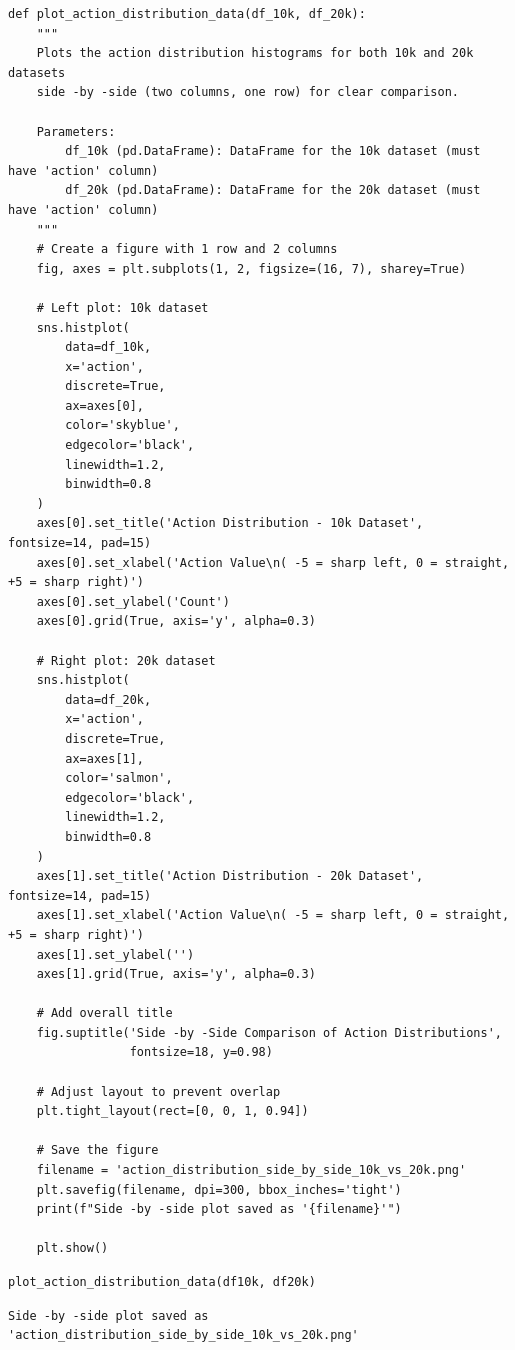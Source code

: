 \begin{verbatim}
def plot_action_distribution_data(df_10k, df_20k):
    """
    Plots the action distribution histograms for both 10k and 20k datasets
    side -by -side (two columns, one row) for clear comparison.
    
    Parameters:
        df_10k (pd.DataFrame): DataFrame for the 10k dataset (must have 'action' column)
        df_20k (pd.DataFrame): DataFrame for the 20k dataset (must have 'action' column)
    """
    # Create a figure with 1 row and 2 columns
    fig, axes = plt.subplots(1, 2, figsize=(16, 7), sharey=True)
    
    # Left plot: 10k dataset
    sns.histplot(
        data=df_10k,
        x='action',
        discrete=True,
        ax=axes[0],
        color='skyblue',
        edgecolor='black',
        linewidth=1.2,
        binwidth=0.8
    )
    axes[0].set_title('Action Distribution - 10k Dataset', fontsize=14, pad=15)
    axes[0].set_xlabel('Action Value\n( -5 = sharp left, 0 = straight, +5 = sharp right)')
    axes[0].set_ylabel('Count')
    axes[0].grid(True, axis='y', alpha=0.3)
    
    # Right plot: 20k dataset
    sns.histplot(
        data=df_20k,
        x='action',
        discrete=True,
        ax=axes[1],
        color='salmon',
        edgecolor='black',
        linewidth=1.2,
        binwidth=0.8
    )
    axes[1].set_title('Action Distribution - 20k Dataset', fontsize=14, pad=15)
    axes[1].set_xlabel('Action Value\n( -5 = sharp left, 0 = straight, +5 = sharp right)')
    axes[1].set_ylabel('')
    axes[1].grid(True, axis='y', alpha=0.3)
    
    # Add overall title
    fig.suptitle('Side -by -Side Comparison of Action Distributions', 
                 fontsize=18, y=0.98)
    
    # Adjust layout to prevent overlap
    plt.tight_layout(rect=[0, 0, 1, 0.94])
    
    # Save the figure
    filename = 'action_distribution_side_by_side_10k_vs_20k.png'
    plt.savefig(filename, dpi=300, bbox_inches='tight')
    print(f"Side -by -side plot saved as '{filename}'")
    
    plt.show()
\end{verbatim}

\begin{verbatim}
plot_action_distribution_data(df10k, df20k)
\end{verbatim}

\begin{verbatim}
Side -by -side plot saved as 'action_distribution_side_by_side_10k_vs_20k.png'
\end{verbatim}

